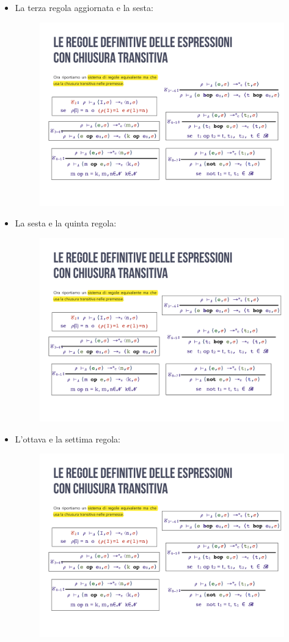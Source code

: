 \documentclass[a4paper]{article}
\begin{document}
\begin{itemize}
 		\item La terza regola aggiornata e la sesta:
 		\begin{figure}[!htp]
 			\centering
 			\includegraphics[width=.7\textwidth]{img/regola_espressione-up-transitiva-3b_6.pdf}
 		\end{figure}
 		
 		\item La sesta e la quinta regola:
 		\begin{figure}[!htp]
 			\centering
 			\includegraphics[width=.7\textwidth]{img/regola_espressione-up-transitiva-6_5.pdf}
 		\end{figure}\newpage
 		
 		\item L'ottava e la settima regola:
 		\begin{figure}[!htp]
 			\centering
 			\includegraphics[width=.7\textwidth]{img/regola_espressione-up-transitiva-8_7.pdf}
 		\end{figure}
 	\end{itemize}
 
\end{document}
